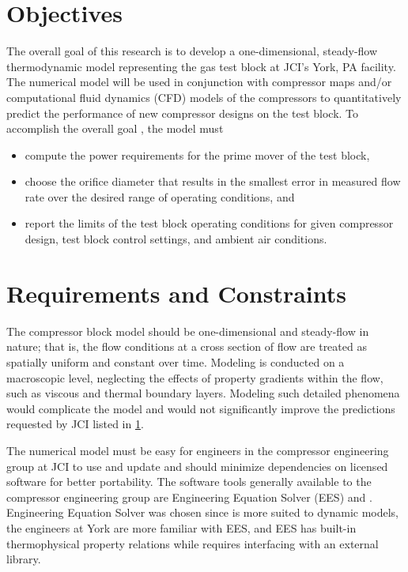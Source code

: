 \section{Objectives} \label{sec:objective}
The overall goal of this research is to develop a one-dimensional, steady-flow thermodynamic model 
representing the  gas test block at JCI's York, PA facility. 
The numerical model will be used in conjunction with compressor maps and/or computational fluid dynamics (CFD)%
models of the compressors to quantitatively predict the performance of new compressor designs on the test block. 
To accomplish the overall goal \citep{iancu2012}, the model must
\begin{itemize}
  \item compute the power requirements for the prime mover of the test block,
  \item choose the orifice diameter that results in the smallest error in measured
    flow rate over the desired range of operating conditions, and 
  \item report the limits of the test block operating conditions for given compressor 
		design, test block control settings, and ambient air conditions.
\end{itemize}

\section{Requirements and Constraints} \label{sec:requirements}
The compressor block model should be one-dimensional and steady-flow in nature; 
that is, the flow conditions at a cross section of flow 
are treated as spatially uniform and constant over time. 
Modeling is conducted on a macroscopic level, 
neglecting the effects of property gradients within the flow, 
such as viscous and thermal boundary layers. 
Modeling such detailed phenomena would complicate the model 
and would not significantly improve the predictions requested by JCI listed in \cref{sec:objective}.

The numerical model must be easy for engineers in the compressor engineering group at JCI 
to use and update and should minimize dependencies on licensed software for better portability. 
The software tools generally available to the compressor engineering group are 
Engineering Equation Solver (EES) and \MLS{}. 
Engineering Equation Solver was chosen since \MLS{} is more suited to dynamic models, 
the engineers at York are more familiar with EES, 
and EES has built-in thermophysical property relations 
while \MLS{} requires interfacing with an external library.

